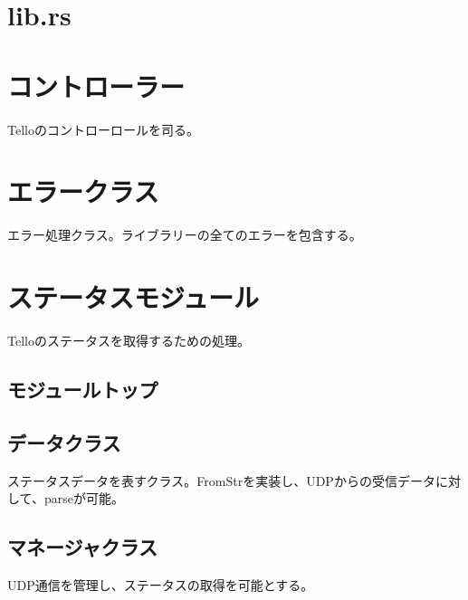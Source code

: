 \documentclass[a4paper, 12pt]{ltjsarticle}
\begin{document}
\section {lib.rs}

\clearpage

\section {コントローラー}
Telloのコントローロールを司る。

\clearpage

\section {エラークラス}
エラー処理クラス。ライブラリーの全てのエラーを包含する。

\clearpage

\section {ステータスモジュール}
Telloのステータスを取得するための処理。
\subsection {モジュールトップ}

\clearpage

\subsection {データクラス}
ステータスデータを表すクラス。FromStrを実装し、UDPからの受信データに対して、parseが可能。

\clearpage

\subsection {マネージャクラス}
UDP通信を管理し、ステータスの取得を可能とする。

\clearpage
\end{document}
